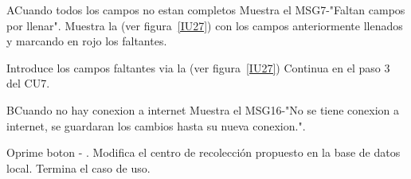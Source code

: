 \begin{UCtrayectoriaA}{A}{Cuando todos los campos no estan completos}
	\UCpaso Muestra el MSG7-"Faltan campos por llenar".
	\UCpaso Muestra la  (ver figura~\ref{IU27}) con los campos anteriormente llenados y marcando en rojo los faltantes.
	\item\UCactor Introduce los campos faltantes via la  (ver figura~\ref{IU27}) 
	\UCpaso Continua en el paso 3 del CU7.
\end{UCtrayectoriaA}

\begin{UCtrayectoriaA}{B}{Cuando no hay conexion a internet}
	\UCpaso Muestra el MSG16-"No se tiene conexion a internet, se guardaran los cambios hasta su nueva conexion.".
	\item\UCactor Oprime boton - .
	\UCpaso Modifica el centro de recolección propuesto  en la base de datos local.	
	\UCpaso[] Termina el caso de uso.
\end{UCtrayectoriaA}
 

 
 
